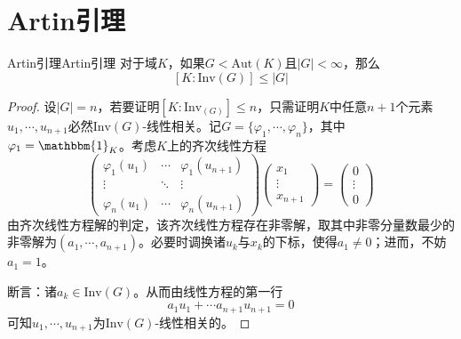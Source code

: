 \documentclass[lang = cn, scheme = chinese, thmcnt = section, usesamecnt]{elegantbook}
\newcommand{\Aut}{\mathrm{Aut}}
\newcommand{\Inv}{\mathrm{Inv}}
\begin{document}
\section{Artin引理}

\begin{lemma}{Artin引理}{Artin引理}
	对于域$K$，如果$G<\Aut(K)$且$|G|<\infty$，那么%
	$$
	[K:\Inv(G)]\le |G|
	$$
\end{lemma}

\begin{proof}
	设$|G|=n$，若要证明$[K:\Inv_(G)]\le n$，只需证明$K$中任意$n+1$个元素$u_1,\cdots,u_{n+1}$必然$\Inv(G)$-线性相关。记$G=\{ \varphi_1,\cdots,\varphi_n \}$，其中$\varphi_1=\mathbbm{1}_K$。考虑$K$上的齐次线性方程%
	$$
	\begin{pmatrix}
		\varphi_1(u_1) & \cdots & \varphi_1(u_{n+1}) \\
		\vdots & \ddots & \vdots \\
		\varphi_n(u_1) & \cdots & \varphi_n(u_{n+1})
	\end{pmatrix}
	\begin{pmatrix}
		x_1 \\
		\vdots \\
		x_{n+1}
	\end{pmatrix}
	=\begin{pmatrix}
		0 \\
		\vdots \\
		0
	\end{pmatrix}
	$$
	由齐次线性方程解的判定，该齐次线性方程存在非零解，取其中非零分量数最少的非零解为$(a_1,\cdots,a_{n+1})$。必要时调换诸$u_k$与$x_k$的下标，使得$a_1\ne 0$；进而，不妨$a_1=1$。
	
	断言：诸$a_k\in\Inv(G)$。从而由线性方程的第一行
	$$
	a_1u_1+\cdots a_{n+1}u_{n+1}=0
	$$
	可知$u_1,\cdots,u_{n+1}$为$\Inv(G)$-线性相关的。
	

\end{proof}
\end{document}
